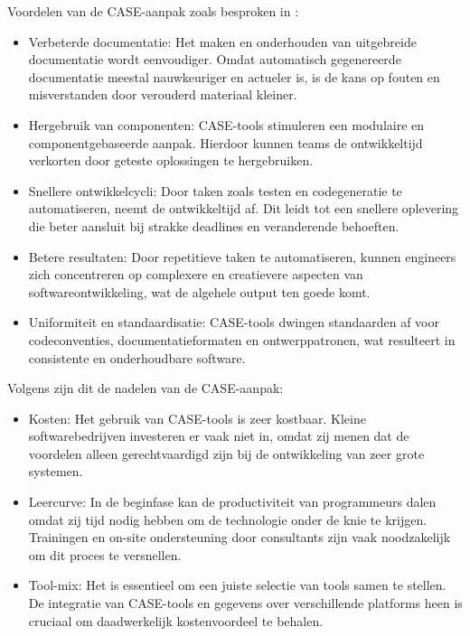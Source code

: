  Voordelen van de CASE-aanpak zoals besproken in \textcite{GeeksForGeeks2024}:
 \begin{itemize}
     \item Verbeterde documentatie: Het maken en onderhouden van uitgebreide documentatie wordt eenvoudiger. Omdat automatisch gegenereerde documentatie meestal nauwkeuriger en actueler is, is de kans op fouten en misverstanden door verouderd materiaal kleiner.
     \item Hergebruik van componenten: CASE-tools stimuleren een modulaire en componentgebaseerde aanpak. Hierdoor kunnen teams de ontwikkeltijd verkorten door geteste oplossingen te hergebruiken.
     \item Snellere ontwikkelcycli: Door taken zoals testen en codegeneratie te automatiseren, neemt de ontwikkeltijd af. Dit leidt tot een snellere oplevering die beter aansluit bij strakke deadlines en veranderende behoeften.
     \item Betere resultaten: Door repetitieve taken te automatiseren, kunnen engineers zich concentreren op complexere en creatievere aspecten van softwareontwikkeling, wat de algehele output ten goede komt.
     \item Uniformiteit en standaardisatie: CASE-tools dwingen standaarden af voor codeconventies, documentatieformaten en ontwerppatronen, wat resulteert in consistente en onderhoudbare software.
 \end{itemize}
 Volgens \textcite{Roberts2026} zijn dit de nadelen van de CASE-aanpak:
 \begin{itemize}
     \item Kosten: Het gebruik van CASE-tools is zeer kostbaar. Kleine softwarebedrijven investeren er vaak niet in, omdat zij menen dat de voordelen alleen gerechtvaardigd zijn bij de ontwikkeling van zeer grote systemen.
     \item Leercurve: In de beginfase kan de productiviteit van programmeurs dalen omdat zij tijd nodig hebben om de technologie onder de knie te krijgen. Trainingen en on-site ondersteuning door consultants zijn vaak noodzakelijk om dit proces te versnellen.
     \item Tool-mix: Het is essentieel om een juiste selectie van tools samen te stellen. De integratie van CASE-tools en gegevens over verschillende platforms heen is cruciaal om daadwerkelijk kostenvoordeel te behalen.
 \end{itemize}
 
